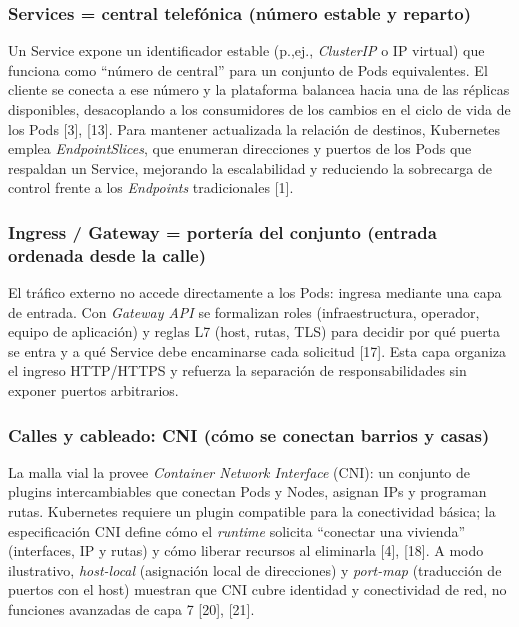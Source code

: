 \documentclass[journal]{IEEEtran}
\begin{document}
\medskip
\subsubsection{Services = central telefónica (número estable y reparto)}

Un Service expone un identificador estable (p.,ej., \emph{ClusterIP} o IP virtual) que funciona como “número de central” para un conjunto de Pods equivalentes. El cliente se conecta a ese número y la plataforma balancea hacia una de las réplicas disponibles, desacoplando a los consumidores de los cambios en el ciclo de vida de los Pods [3], [13].
Para mantener actualizada la relación de destinos, Kubernetes emplea \emph{EndpointSlices}, que enumeran direcciones y puertos de los Pods que respaldan un Service, mejorando la escalabilidad y reduciendo la sobrecarga de control frente a los \emph{Endpoints} tradicionales [1].

\medskip
\subsubsection{Ingress / Gateway = portería del conjunto (entrada ordenada desde la calle)}

El tráfico externo no accede directamente a los Pods: ingresa mediante una capa de entrada. Con \emph{Gateway API} se formalizan roles (infraestructura, operador, equipo de aplicación) y reglas L7 (host, rutas, TLS) para decidir por qué puerta se entra y a qué Service debe encaminarse cada solicitud [17]. Esta capa organiza el ingreso HTTP/HTTPS y refuerza la separación de responsabilidades sin exponer puertos arbitrarios.

\medskip
\subsubsection{Calles y cableado: CNI (cómo se conectan barrios y casas)}

La malla vial la provee \emph{Container Network Interface} (CNI): un conjunto de plugins intercambiables que conectan Pods y Nodes, asignan IPs y programan rutas. Kubernetes requiere un plugin compatible para la conectividad básica; la especificación CNI define cómo el \emph{runtime} solicita “conectar una vivienda” (interfaces, IP y rutas) y cómo liberar recursos al eliminarla [4], [18].
A modo ilustrativo, \emph{host-local} (asignación local de direcciones) y \emph{port-map} (traducción de puertos con el host) muestran que CNI cubre identidad y conectividad de red, no funciones avanzadas de capa 7 [20], [21].
\end{document}
